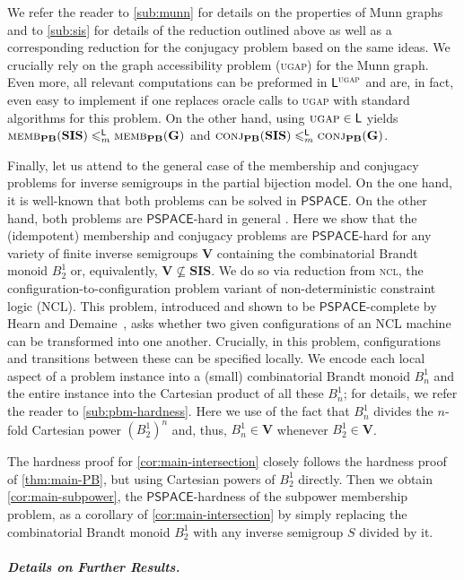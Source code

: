 \documentclass[anonymous,letter,UKenglish,cleveref,autoref,thm-restate]{lipics-v2021}
\renewcommand{\leq}{\leqslant}
\newcommand{\sse}{\subseteq}
\newcommand{\LOGSPACE}{\ensuremath{\mathsf{L}}\xspace}
\newcommand{\PSPACE}{\ensuremath{\mathsf{PSPACE}}\xspace}
\newcommand{\vV}{\ensuremath{\mathbf{V}}}
\newcommand{\vG}{\ensuremath{\mathbf{G}}}
\newcommand{\vSI}{\ensuremath{\mathbf{SIS}}}
\theoremstyle{plain}
\theoremstyle{plain}
\newcommand{\dMemb}[2][]{\textup{\textsc{memb${}_{\mathbf{#1}}\expandafter\ifx\expandafter\relax\detokenize{#2}\relax\else(#2)\fi$}}}
\newcommand{\dConj}[2][]{\textup{\textsc{conj${}_{\mathbf{#1}}\expandafter\ifx\expandafter\relax\detokenize{#2}\relax\else(#2)\fi$}}}
\newcommand{\prob}[1]{\textup{\textsc{#1}}\xspace}
\newcommand{\dUGAP}{\prob{ugap}}
\newcommand{\dNCL}{\prob{ncl}}
\newcommand{\mysubparagraph}[1]{\vspace*{-2mm}\subparagraph*{#1}}
\begin{document}
We refer the reader to \cref{sub:munn} for details on the properties of Munn graphs and to \cref{sub:sis} for details of the reduction outlined above as well as a corresponding reduction for the conjugacy problem based on the same ideas.
We crucially rely on the graph accessibility problem (\dUGAP) for the Munn graph.
Even more, all relevant computations can be preformed in $\LOGSPACE^{\dUGAP}$ and are, in fact, even easy to implement if one replaces oracle calls to \dUGAP with standard algorithms for this problem.
On the other hand, using $\dUGAP \in \LOGSPACE$ \cite{Reingold08} yields $\dMemb[PB]{\vSI} \leq_m^{\LOGSPACE} \dMemb[PB]{\vG}$ and $\dConj[PB]{\vSI} \leq_m^{\LOGSPACE} \dConj[PB]{\vG}$.

Finally, let us attend to the general case of the membership and conjugacy problems for inverse semigroups in the partial bijection model.
On the one hand, it is well-known that both problems can be solved in \PSPACE. 
On the other hand, both problems are \PSPACE-hard in general \cite{BirgetM08,Jack23}. Here we show that the (idempotent) membership and conjugacy problems are \PSPACE-hard for any variety of finite inverse semigroups $\vV$ containing the combinatorial Brandt monoid $B^1_2$ or, equivalently, $\vV \not\sse \vSI$.
We do so via reduction from \dNCL, the configuration-to-configuration problem variant of non-deterministic constraint logic (NCL). 
This problem, introduced and shown to be \PSPACE-complete by Hearn and Demaine~\cite{HearnD05}, asks whether two given configurations of an NCL machine can be transformed into one another.
Crucially, in this problem, configurations and transitions between these can be specified locally.
We encode each local aspect of a problem instance into a (small) combinatorial Brandt monoid $B^1_n$ and the entire instance into the Cartesian product of all  these $B^1_n$; for details, we refer the reader to \cref{sub:pbm-hardness}.
Here we use of the fact that $B^1_n$ divides the $n$-fold Cartesian power $(B^1_2)^n$ and, thus, $B^1_n \in \vV$ whenever $B^1_2 \in \vV$.

The hardness proof for \cref{cor:main-intersection} closely follows the hardness proof of \cref{thm:main-PB}, but using Cartesian powers of $B^1_2$ directly. 
Then we obtain \cref{cor:main-subpower}, the \PSPACE-hardness of the subpower membership problem, as a corollary of \cref{cor:main-intersection} by simply replacing the combinatorial Brandt monoid $B^1_2$ with any inverse semigroup $S$ divided by it.


\mysubparagraph{Details on Further Results.}
\end{document}
